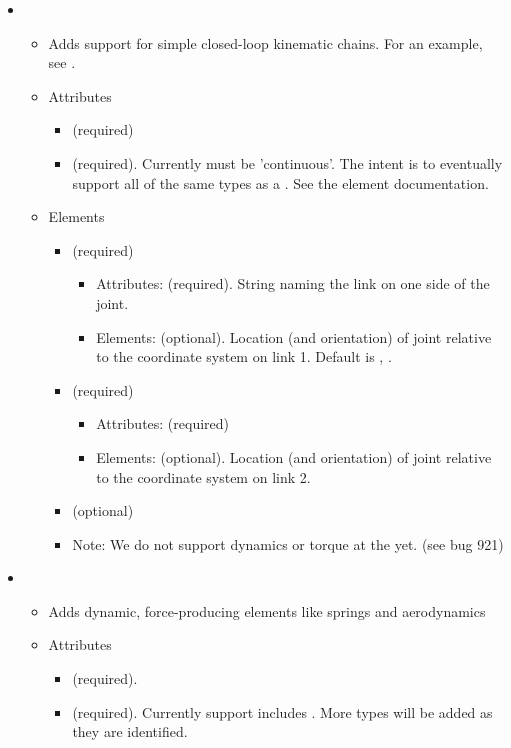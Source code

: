 \begin{itemize}
\item {}
\begin{itemize}
\item Adds support for simple closed-loop kinematic chains.  For an example, see .  
\item Attributes
\begin{itemize}
\item {} (required)
\item {} (required). Currently must be 'continuous'.  The intent is to eventually support all of the same types as a . See the  element documentation. 
\end{itemize}
\item Elements
\begin{itemize}
\item {} (required)
\begin{itemize}
\item Attributes:  (required). String naming the link on one side of the joint.
\item Elements:  (optional). Location (and orientation) of joint relative to the coordinate system on link 1. Default is , . 
\end{itemize}
\item {} (required)
\begin{itemize}
\item Attributes:  (required)
\item Elements:  (optional). Location (and orientation) of joint relative to the coordinate system on link 2. 
\end{itemize}
\item {} (optional) 
\item Note: We do not support dynamics or torque at the  yet. (see bug 921) 
\end{itemize}
\end{itemize}

\item {}
\begin{itemize}
\item Adds dynamic, force-producing elements like springs and
  aerodynamics
\item Attributes
\begin{itemize}
\item {} (required).
\item {} (required).  Currently support includes
  .  More types will be added as they are identified.
\end{itemize}


\end{itemize}
\end{itemize}
